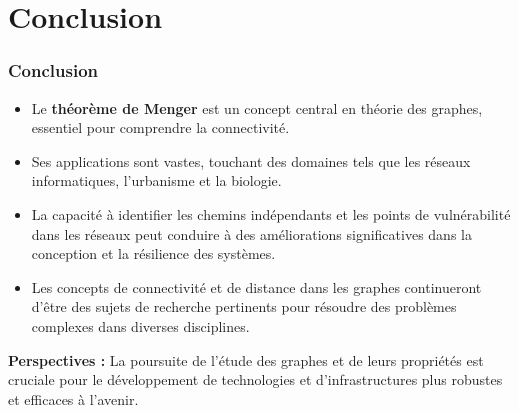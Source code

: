 

\section{Conclusion}
\begin{frame}
\frametitle{Conclusion}
\begin{itemize}
    \item Le \textbf{théorème de Menger} est un concept central en théorie des graphes, essentiel pour comprendre la connectivité.
    \item Ses applications sont vastes, touchant des domaines tels que les réseaux informatiques, l'urbanisme et la biologie.
    \item La capacité à identifier les chemins indépendants et les points de vulnérabilité dans les réseaux peut conduire à des améliorations significatives dans la conception et la résilience des systèmes.
    \item Les concepts de connectivité et de distance dans les graphes continueront d'être des sujets de recherche pertinents pour résoudre des problèmes complexes dans diverses disciplines.
\end{itemize}
\textbf{Perspectives :} La poursuite de l'étude des graphes et de leurs propriétés est cruciale pour le développement de technologies et d'infrastructures plus robustes et efficaces à l'avenir.
\end{frame}
